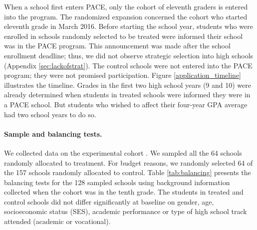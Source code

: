 When a school first enters PACE, only the cohort of eleventh graders is entered into the program. The randomized expansion concerned the cohort who started eleventh grade in March 2016. Before starting the school year, students who were enrolled in schools randomly selected to be treated were informed their school was in the PACE program. This announcement was made after the school enrollment deadline; thus, we did not observe strategic selection into high schools (Appendix \ref{sec:lackofstrat}). The control schools were not entered into the PACE program; they were not promised participation. Figure \ref{application_timeline} illustrates the timeline. Grades in the first two high school years (9 and 10) were already determined when students in treated schools were informed they were in a PACE school. But students who wished to affect their four-year GPA average had two school years to do so.

\vspace{-10pt}
\paragraph{Sample and balancing tests.} We collected data on the experimental cohort \citep{mineduc_experimental_high_school_lists}. We sampled all the 64 schools randomly allocated to treatment. For budget reasons, we randomly selected 64 of the 157 schools randomly allocated to control. Table \ref{tab:balancing} presents the balancing tests for the 128 sampled schools using background information collected when the cohort was in the tenth grade. The students in treated and control schools did not differ significantly at baseline on gender, age, socioeconomic status (SES), academic performance or type of high school track attended (academic or vocational).









